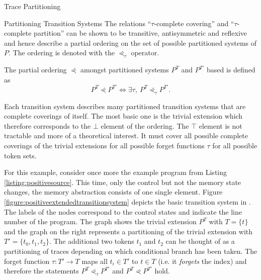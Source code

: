 \begin{chapter}{Trace Partitioning}
\begin{section}{Partitioning Transition Systems}
			The relations ``$\tau$-complete covering'' and ``$\tau$-complete partition'' can be shown to be transitive, antisymmetric and reflexive and hence describe a partial ordering on the set of possible partitioned systems of $P$. The ordering is denoted with the $\curlyeqprec_\tau$ operator.

		\begin{definition}
			The partial ordering $\curlyeqprec$ amongst partitioned systems $P^T$ and $P^{T'}$ based is defined as
			\begin{equation}
				P^T \curlyeqprec P^{T'} \Longleftrightarrow \exists \tau, \ P^T \curlyeqprec_\tau P^{T'}.
			\end{equation}
		\end{definition}

		Each transition system describes many partitioned transition systems that are complete coverings of itself. The most basic one is the trivial extension which therefore corresponds to the $\bot$ element of the ordering. The $\top$ element is not tractable and more of a theoretical interest. It must cover all possible complete coverings of the trivial extensions for all possible forget functions $\tau$ for all possible token sets.

		\begin{example}
			\label{example:extendedsystem}
			For this example, consider once more the example program from Listing \ref{listing:positivesource}. This time, only the control but not the memory state changes, the memory abstraction consists of one single element. Figure \ref{figure:positiveextendedtransitionsystem} depicts the basic transition system in \one. The labels of the nodes correspond to the control states and indicate the line number of the program. The graph \two shows the trivial extension $P^T$ with $T = \{t\}$ and the graph on the right represents a partitioning of the trivial extension with $T' = \{t_0, t_1, t_2\}$. The additional two tokens $t_1$ and $t_2$ can be thought of as a partitioning of traces depending on which conditional branch has been taken. The forget function $\tau: T' \to T$ maps all $t_i \in T'$ to $t \in T$ (i.e. it \emph{forgets} the index) and therefore the statements $P^T \curlyeqprec_\tau P^{T'}$ and $P^T \curlyeqprec P^{T'}$ hold.
			\exampleend


\end{example}
\end{section}
\end{chapter}
